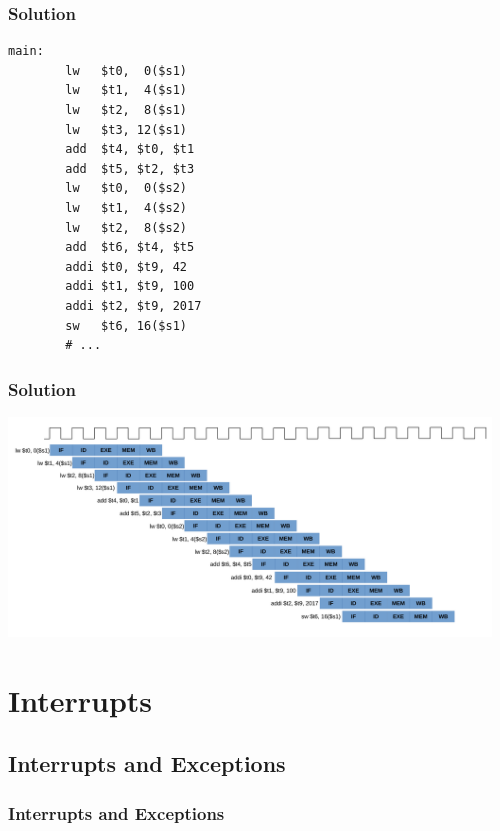 \documentclass{beamer}
\newcounter{exo}
\begin{document}
\begin{frame}[fragile]
\frametitle{Solution}

\scriptsize

\begin{lstlisting}[linebackgroundcolor={\lstcolorlines{8,9,10,12,13,14}}]
main:
        lw   $t0,  0($s1)
        lw   $t1,  4($s1)
        lw   $t2,  8($s1)
        lw   $t3, 12($s1)
        add  $t4, $t0, $t1
        add  $t5, $t2, $t3
        lw   $t0,  0($s2)
        lw   $t1,  4($s2)
        lw   $t2,  8($s2)
        add  $t6, $t4, $t5
        addi $t0, $t9, 42
        addi $t1, $t9, 100
        addi $t2, $t9, 2017
        sw   $t6, 16($s1)
        # ...
\end{lstlisting}

\end{frame}

\begin{frame}[fragile]
\frametitle{Solution}

\begin{center}
\hspace*{-1cm}\includegraphics[width=12.8cm]{pipelining_reorder_exo2.pdf}
\end{center}

\end{frame}

\fi

\section{Interrupts}

\subsection{Interrupts and Exceptions}

\begin{frame}%
\frametitle{Interrupts and Exceptions}


\end{frame}
\end{document}
